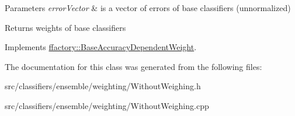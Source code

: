 \begin{DoxyParams}{Parameters}
{\em error\-Vector} & is a vector of errors of base classifiers (unnormalized) \\
\hline
\end{DoxyParams}
\begin{DoxyReturn}{Returns}
weights of base classifiers 
\end{DoxyReturn}


Implements \hyperlink{classffactory_1_1_base_accuracy_dependent_weight_a0baa145415e5e75b3b90c787c7e5a879}{ffactory\-::\-Base\-Accuracy\-Dependent\-Weight}.



The documentation for this class was generated from the following files\-:\begin{DoxyCompactItemize}
\item 
src/classifiers/ensemble/weighting/Without\-Weighing.\-h\item 
src/classifiers/ensemble/weighting/Without\-Weighing.\-cpp\end{DoxyCompactItemize}
